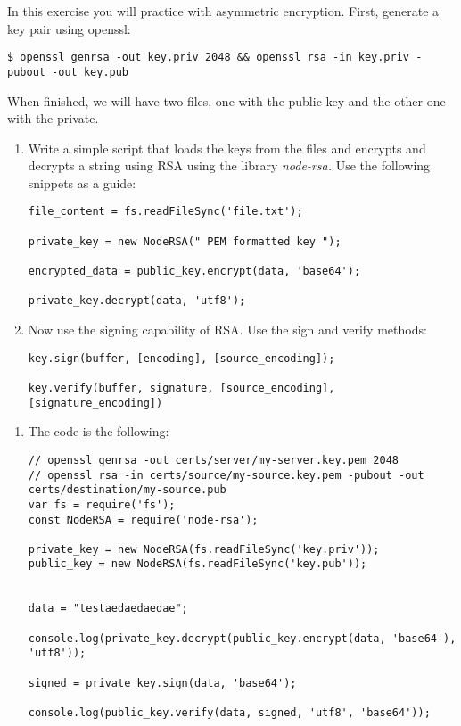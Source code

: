 
\begin{Exercise}[label={basic-js-crypto-rsa}]
In this exercise you will practice with asymmetric encryption.
First, generate a key pair using openssl:

\begin{lstlisting}
$ openssl genrsa -out key.priv 2048 && openssl rsa -in key.priv -pubout -out key.pub
\end{lstlisting}

When finished, we will have two files, 
one with the public key and the other one with the private.

\begin{enumerate}[1.]
	
\item Write a simple script that loads the keys from the files 
and encrypts and decrypts a string using RSA using 
the library \textit{node-rsa.}
Use the following snippets as a guide:
\begin{lstlisting}[style=JavaScript]
file_content = fs.readFileSync('file.txt');

private_key = new NodeRSA(" PEM formatted key ");

encrypted_data = public_key.encrypt(data, 'base64');

private_key.decrypt(data, 'utf8');
\end{lstlisting}
\item Now use the signing capability of RSA. Use the sign and verify methods:
\begin{lstlisting}[style=JavaScript]
key.sign(buffer, [encoding], [source_encoding]);

key.verify(buffer, signature, [source_encoding], [signature_encoding])
\end{lstlisting}
	
\end{enumerate}
\end{Exercise}

\begin{Answer}[ref={basic-js-crypto-rsa}]
\begin{enumerate}[1.]
\item The code is the following: 

\begin{lstlisting}[style=JavaScript]
// openssl genrsa -out certs/server/my-server.key.pem 2048
// openssl rsa -in certs/source/my-source.key.pem -pubout -out certs/destination/my-source.pub
var fs = require('fs');
const NodeRSA = require('node-rsa');

private_key = new NodeRSA(fs.readFileSync('key.priv'));
public_key = new NodeRSA(fs.readFileSync('key.pub'));


data = "testaedaedaedae";

console.log(private_key.decrypt(public_key.encrypt(data, 'base64'), 'utf8'));

signed = private_key.sign(data, 'base64');

console.log(public_key.verify(data, signed, 'utf8', 'base64'));
\end{lstlisting}
\end{enumerate}
\end{Answer}
